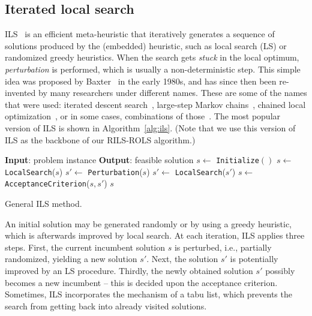 \documentclass{bmcart}
\begin{document}
\subsection{Iterated local search}
ILS~\cite{lourencco2003iterated} is an efficient meta-heuristic that iteratively generates a sequence of solutions produced by the (embedded) heuristic, such as local search (LS) or randomized greedy heuristics. When the search gets \emph{stuck} in the local optimum, \emph{perturbation} is performed, which is usually a non-deterministic step. This simple idea was proposed by Baxter~\cite{baxter1981local} in the early 1980s, and has since then been re-invented by many researchers under different names. These are some of the names that were used: iterated descent search~\cite{baum1998iterated}, large-step
Markov chains~\cite{martin1991large}, chained local optimization~\cite{martin1996combining}, or in some cases, combinations of those~\cite{applegate2003chained}. The most popular version of ILS is shown in Algorithm~\ref{alg:ils}. (Note that we use this version of ILS as the backbone of our \textsc{RILS}-\textsc{ROLS} algorithm.)

\begin{algorithm}
	\begin{algorithmic}[1] 
	\Statex \textbf{Input}: problem instance
		\Statex \textbf{Output}: feasible solution 
		\State $s \gets$ \texttt{Initialize}$()$
		\State  $s \gets$ \texttt{LocalSearch}($s$)
		\State  $s' \gets$ \texttt{Perturbation}($s$)
		\State  $s' \gets$ \texttt{LocalSearch}($s'$)
		\State  $ s \gets$ \texttt{AcceptanceCriterion}($s, s'$)
		\EndWhile
		\State \Return $s$
	\end{algorithmic}
	\caption{General ILS method.}
	\label{alg:ils}
\end{algorithm}  

An initial solution may be generated randomly or by using a greedy heuristic, which is afterwards improved by local search. At each iteration, ILS applies three steps. First, the current incumbent solution $s$ is perturbed, i.e., partially randomized, yielding a new solution $s'$. Next, the solution $s'$ is potentially improved by an LS procedure. Thirdly, the newly obtained solution $s'$  possibly becomes a new incumbent -- this is decided upon the acceptance criterion. Sometimes, ILS incorporates the mechanism of a tabu list, which prevents the search from getting back into already visited solutions.  		 
\end{document}
